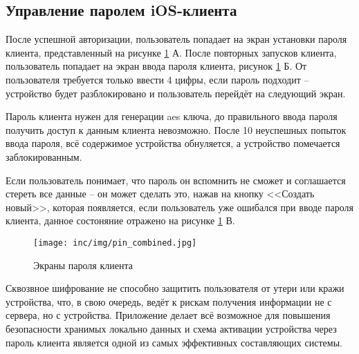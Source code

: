\subsection{Управление паролем iOS-клиента}
\label{sec:usage:pin}

После успешной авторизации, пользователь попадает на экран установки пароля клиента, представленный на рисунке \ref{sec:usage:pin:ui} А. После повторных запусков клиента, пользователь попадает на экран ввода пароля клиента, рисунок \ref{sec:usage:pin:ui} Б. От пользователя требуется только ввести 4 цифры, если пароль подходит -- устройство будет разблокировано и пользователь перейдёт на следующий экран.

Пароль клиента нужен для генерации \gls{aes} ключа, до правильного ввода пароля получить доступ к данным клиента невозможно. После 10 неуспешных попыток ввода пароля, всё содержимое устройства обнуляется, а устройство помечается заблокированным.

Если пользователь понимает, что пароль он вспомнить не сможет и соглашается стереть все данные -- он может сделать это, нажав на кнопку <<Создать новый>>, которая появляется, если пользователь уже ошибался при вводе пароля клиента, данное состоняние отражено на рисунке \ref{sec:usage:pin:ui} В.

\begin{figure}[h]
  \centering
    \texttt{[image: inc/img/pin\_combined.jpg]}
  \caption{Экраны пароля клиента}
  \label{sec:usage:pin:ui}
\end{figure}

Сквозвное шифрование не способно защитить пользователя от утери или кражи устройства, что, в свою очередь, ведёт к рискам получения информации не с сервера, но с устройства. Приложение делает всё возможное для повышения безопасности хранимых локально данных и схема активации устройства через пароль клиента является одной из самых эффективных составляющих системы.